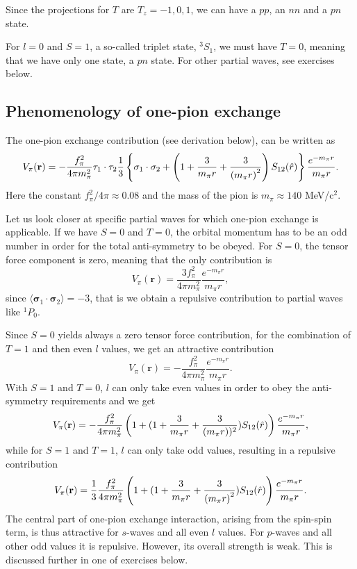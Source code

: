 \documentclass[graybox,sectrefs,envcountresetchap,open=right]{svmonodo}
\begin{document}
\noindent
Since the projections for $T$ are $T_z=-1,0,1$, we can have a $pp$, an $nn$ and a $pn$ state.

\noindent
For $l=0$ and $S=1$, a so-called triplet state, $^3S_1$, we must have $T=0$, meaning that we have only one state, a $pn$ state. For other partial waves, see exercises below. 



\subsection{Phenomenology of one-pion exchange}

The one-pion exchange contribution (see derivation below), can be written as 
\[
V_{\pi}(\mathbf{r})= -\frac{f_{\pi}^{2}}{4\pi m_{\pi}^{2}}\mathbf{ \tau}_1\cdot\mathbf{\tau}_2
\frac{1}{3}\left\{\mathbf{ \sigma}_1\cdot\mathbf{ \sigma}_2+\left( 1 + {3\over m_\pi r} + {3\over\left(m_\pi r\right)^2}\right) S_{12} (\hat r)\right\} \frac{e^{-m_\pi r}}{m_\pi r}.
\]
Here the constant $f_{\pi}^{2}/4\pi\approx 0.08$ and the mass of the pion is $m_\pi\approx 140$ MeV/$\mbox{c}^2$.  

\noindent
Let us look closer at specific partial waves for which one-pion exchange is applicable. If we have $S=0$ and $T=0$, the 
orbital momentum has to be an odd number in order for the total anti-symmetry to be obeyed. For $S=0$, the tensor force component is zero, meaning that 
the only contribution is 
\[
V_{\pi}(\mathbf{r})=\frac{3f_{\pi}^{2}}{4\pi m_{\pi}^{2}}\frac{e^{-m_\pi r}}{m_\pi r},
\]
since $\langle\mathbf{ \sigma}_1\cdot\mathbf{ \sigma}_2\rangle=-3$, that is we obtain a repulsive contribution to partial waves like 
$^1P_0$.

\noindent
Since $S=0$ yields always a zero tensor force contribution, for the combination of $T=1$ and then even $l$ values, we get an attractive contribution
\[
V_{\pi}(\mathbf{r})=-\frac{f_{\pi}^{2}}{4\pi m_{\pi}^{2}}\frac{e^{-m_\pi r}}{m_\pi r}.
\]
With $S=1$ and $T=0$, $l$ can only take even values in order to obey the anti-symmetry requirements and we get
\[
V_{\pi}(\mathbf{r})= -\frac{f_{\pi}^{2}}{4\pi m_{\pi}^{2}}
\left(1+( 1 + {3\over m_\pi r} + {3\over\left(m_\pi r\right))^2}) S_{12} (\hat r)\right) \frac{e^{-m_\pi r}}{m_\pi r},
\]
while for $S=1$ and $T=1$, $l$ can only take odd values, resulting in a repulsive contribution 
\[
V_{\pi}(\mathbf{r})= \frac{1}{3}\frac{f_{\pi}^{2}}{4\pi m_{\pi}^{2}}\left(1+( 1 + {3\over m_\pi r} + {3\over\left(m_\pi r\right)^2}) S_{12} (\hat r)\right) \frac{e^{-m_\pi r}}{m_\pi r}.
\]
The central part of one-pion exchange interaction, arising from the spin-spin term,  
is thus attractive for $s$-waves and all even $l$ values. For $p$-waves and all other odd values
it is repulsive. However, its overall strength is weak. This is discussed further in one of exercises below.
\end{document}
